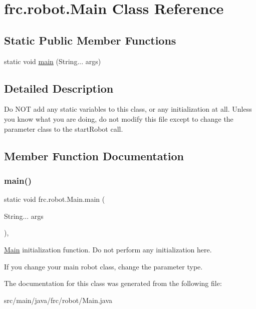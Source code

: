 \hypertarget{classfrc_1_1robot_1_1_main}{}\section{frc.\+robot.\+Main Class Reference}
\label{classfrc_1_1robot_1_1_main}
\subsection*{Static Public Member Functions}
\begin{DoxyCompactItemize}
\item 
static void \mbox{\hyperlink{classfrc_1_1robot_1_1_main_ae60066a646cefc16d3e7d57b8fa22097}{main}} (String... args)
\end{DoxyCompactItemize}


\subsection{Detailed Description}
Do N\+OT add any static variables to this class, or any initialization at all. Unless you know what you are doing, do not modify this file except to change the parameter class to the start\+Robot call. 

\subsection{Member Function Documentation}
\mbox{\label{classfrc_1_1robot_1_1_main_ae60066a646cefc16d3e7d57b8fa22097}} 
\subsubsection{\texorpdfstring{main()}{main()}}
{\footnotesize\ttfamily static void frc.\+robot.\+Main.\+main (\begin{DoxyParamCaption}\item[{String...}]{args }\end{DoxyParamCaption})\hspace{0.3cm}{\ttfamily [inline]}, {\ttfamily [static]}}

\mbox{\hyperlink{classfrc_1_1robot_1_1_main}{Main}} initialization function. Do not perform any initialization here.

If you change your main robot class, change the parameter type. 

The documentation for this class was generated from the following file\+:\begin{DoxyCompactItemize}
\item 
src/main/java/frc/robot/Main.\+java\end{DoxyCompactItemize}
